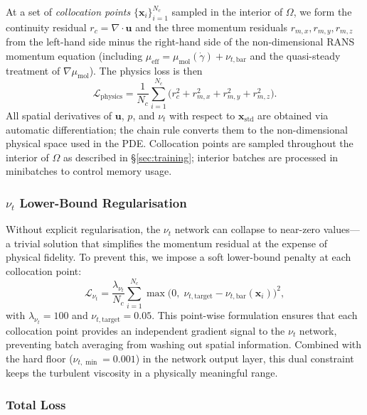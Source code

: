 \documentclass[11pt,a4paper]{article}
\begin{document}
At a set of \emph{collocation points} $\{\mathbf{x}_i\}_{i=1}^{N_c}$ sampled in the interior of $\Omega$, we form the continuity residual $r_c = \nabla \cdot \mathbf{u}$ and the three momentum residuals $r_{m,x}, r_{m,y}, r_{m,z}$ from the left-hand side minus the right-hand side of the non-dimensional RANS momentum equation (including $\mu_{\text{eff}} = \mu_{\text{mol}}(\dot{\gamma}) + \nu_{t,\text{bar}}$ and the quasi-steady treatment of $\nabla\mu_{\text{mol}}$). The physics loss is then
\begin{equation}
\mathcal{L}_{\text{physics}} = \frac{1}{N_c} \sum_{i=1}^{N_c} \bigl( r_c^2 + r_{m,x}^2 + r_{m,y}^2 + r_{m,z}^2 \bigr).
\end{equation}
All spatial derivatives of $\mathbf{u}$, $p$, and $\nu_t$ with respect to $\mathbf{x}_{\text{std}}$ are obtained via automatic differentiation; the chain rule converts them to the non-dimensional physical space used in the PDE. Collocation points are sampled throughout the interior of $\Omega$ as described in \S\ref{sec:training}; interior batches are processed in minibatches to control memory usage.

\subsubsection{$\nu_t$ Lower-Bound Regularisation}

Without explicit regularisation, the $\nu_t$ network can collapse to near-zero values---a trivial solution that simplifies the momentum residual at the expense of physical fidelity. To prevent this, we impose a soft lower-bound penalty at each collocation point:
\begin{equation}
\mathcal{L}_{\nu_t} = \frac{\lambda_{\nu_t}}{N_c} \sum_{i=1}^{N_c} \max\bigl(0, \;\nu_{t,\text{target}} - \nu_{t,\text{bar}}(\mathbf{x}_i)\bigr)^2,
\end{equation}
with $\lambda_{\nu_t} = 100$ and $\nu_{t,\text{target}} = 0.05$. This point-wise formulation ensures that each collocation point provides an independent gradient signal to the $\nu_t$ network, preventing batch averaging from washing out spatial information. Combined with the hard floor ($\nu_{t,\min} = 0.001$) in the network output layer, this dual constraint keeps the turbulent viscosity in a physically meaningful range.

\subsubsection{Total Loss}
\end{document}
